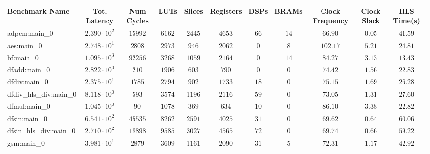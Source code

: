 \begin{tabular}{|l|c|c|c|c|c|c|c|c|c|c|}
\hline
Benchmark Name          & Tot. Latency           & Num Cycles & LUTs      & Slices    & Registers & DSPs    & BRAMs   & Clock Frequency & Clock Slack & HLS Time(s) \\
\hline
adpcm:main\_0           & $ 2.390 \cdot 10^{2} $ & $ 15992  $ & $ 6162  $ & $ 2445  $ & $ 4653  $ & $ 66  $ & $ 14  $ & $ 66.90       $ & $ 0.05    $ & $ 41.59   $ \\
aes:main\_0             & $ 2.748 \cdot 10^{1} $ & $ 2808   $ & $ 2973  $ & $ 946   $ & $ 2062  $ & $ 0   $ & $ 8   $ & $ 102.17      $ & $ 5.21    $ & $ 24.81   $ \\
bf:main\_0              & $ 1.095 \cdot 10^{3} $ & $ 92256  $ & $ 3268  $ & $ 1059  $ & $ 2164  $ & $ 0   $ & $ 14  $ & $ 84.27       $ & $ 3.13    $ & $ 13.43   $ \\
dfadd:main\_0           & $ 2.822 \cdot 10^{0} $ & $ 210    $ & $ 1906  $ & $ 603   $ & $ 790   $ & $ 0   $ & $ 0   $ & $ 74.42       $ & $ 1.56    $ & $ 22.83   $ \\
dfdiv:main\_0           & $ 2.375 \cdot 10^{1} $ & $ 1785   $ & $ 2794  $ & $ 902   $ & $ 1733  $ & $ 18  $ & $ 0   $ & $ 75.15       $ & $ 1.69    $ & $ 26.28   $ \\
dfdiv\_hls\_div:main\_0 & $ 8.118 \cdot 10^{0} $ & $ 593    $ & $ 3574  $ & $ 1196  $ & $ 2116  $ & $ 59  $ & $ 0   $ & $ 73.05       $ & $ 1.31    $ & $ 27.60   $ \\
dfmul:main\_0           & $ 1.045 \cdot 10^{0} $ & $ 90     $ & $ 1078  $ & $ 369   $ & $ 634   $ & $ 10  $ & $ 0   $ & $ 86.10       $ & $ 3.38    $ & $ 22.82   $ \\
dfsin:main\_0           & $ 6.541 \cdot 10^{2} $ & $ 45535  $ & $ 8262  $ & $ 2591  $ & $ 4025  $ & $ 31  $ & $ 0   $ & $ 69.62       $ & $ 0.64    $ & $ 60.06   $ \\
dfsin\_hls\_div:main\_0 & $ 2.710 \cdot 10^{2} $ & $ 18898  $ & $ 9585  $ & $ 3027  $ & $ 4565  $ & $ 72  $ & $ 0   $ & $ 69.74       $ & $ 0.66    $ & $ 59.22   $ \\
gsm:main\_0             & $ 3.981 \cdot 10^{1} $ & $ 2879   $ & $ 3609  $ & $ 1161  $ & $ 2090  $ & $ 31  $ & $ 5   $ & $ 72.31       $ & $ 1.17    $ & $ 42.92   $ \\

\end{tabular}

